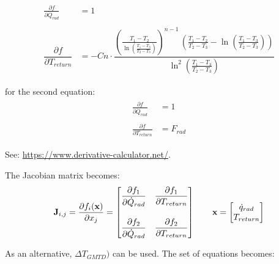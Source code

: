 \begin{equation}
	\begin{aligned}
		\begin{matrix}
			\frac{\partial f}{\partial \dot{Q}_{rad}} &= 1 \\ 
			\\
			\dfrac{\partial f}{\partial T_{return}} &= -Cn\cdot \dfrac{\left(\frac{T_1-T_2}{\ln\left(\frac{T_1-T_3}{T_2-T_3}\right)}\right)^{n-1}\,\left(\frac{T_1-T_2}{T_2-T_3}-\ln\left(\frac{T_1-T_3}{T_2-T_3}\right)\right)}{\ln^2\left(\frac{T_1-T_3}{T_2-T_3}\right)} \\ \\
		\end{matrix}
	\end{aligned}
\end{equation} 
for the second equation:
\begin{equation}
	\begin{aligned}
		\begin{matrix}
			\frac{\partial f}{\partial \dot{Q}_{rad}} &= 1 \\ \\
			\frac{\partial f}{\partial T_{return}} &= F_{rad}
		\end{matrix}
	\end{aligned}
\end{equation} 

See: \url{https://www.derivative-calculator.net/}.

The Jacobian matrix becomes:
\begin{equation}
	\begin{aligned}
		\mathbf{J}_{i,j}=\dfrac{\partial f_{i}(\mathbf{x})}{\partial x_{j}} =
		\begin{bmatrix}
			\dfrac{\partial f_1}{\partial \dot{Q}_{rad}} & \dfrac{\partial f_1}{\partial T_{return}} \\ 
			\vspace{2pt} \\
			\dfrac{\partial f_2}{\partial \dot{Q}_{rad}} & \dfrac{\partial f_2}{\partial T_{return}}
		\end{bmatrix}
		\qquad
		\mathbf{x} =
		\begin{bmatrix}
			\dot{q}_{rad} \\ 
			T_{return}
		\end{bmatrix}
	\end{aligned}
\end{equation} 

As an alternative, $\Delta T_{GMTD})$ can be used. The set of equations becomes:

